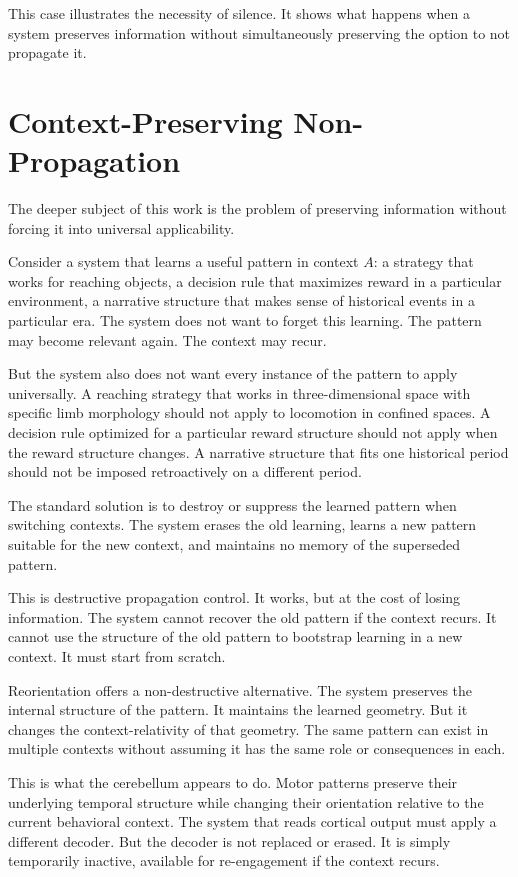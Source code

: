 \documentclass[12pt]{article}
\begin{document}
This case illustrates the necessity of silence. It shows what happens when a system preserves information without simultaneously preserving the option to not propagate it.

\section{Context-Preserving Non-Propagation}

The deeper subject of this work is the problem of preserving information without forcing it into universal applicability.

Consider a system that learns a useful pattern in context $A$: a strategy that works for reaching objects, a decision rule that maximizes reward in a particular environment, a narrative structure that makes sense of historical events in a particular era. The system does not want to forget this learning. The pattern may become relevant again. The context may recur.

But the system also does not want every instance of the pattern to apply universally. A reaching strategy that works in three-dimensional space with specific limb morphology should not apply to locomotion in confined spaces. A decision rule optimized for a particular reward structure should not apply when the reward structure changes. A narrative structure that fits one historical period should not be imposed retroactively on a different period.

The standard solution is to destroy or suppress the learned pattern when switching contexts. The system erases the old learning, learns a new pattern suitable for the new context, and maintains no memory of the superseded pattern.

This is destructive propagation control. It works, but at the cost of losing information. The system cannot recover the old pattern if the context recurs. It cannot use the structure of the old pattern to bootstrap learning in a new context. It must start from scratch.

Reorientation offers a non-destructive alternative. The system preserves the internal structure of the pattern. It maintains the learned geometry. But it changes the context-relativity of that geometry. The same pattern can exist in multiple contexts without assuming it has the same role or consequences in each.

This is what the cerebellum appears to do. Motor patterns preserve their underlying temporal structure while changing their orientation relative to the current behavioral context. The system that reads cortical output must apply a different decoder. But the decoder is not replaced or erased. It is simply temporarily inactive, available for re-engagement if the context recurs.
\end{document}
